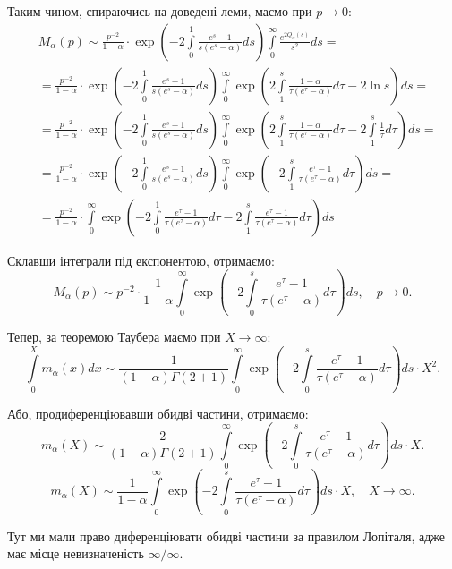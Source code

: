 Таким чином, спираючись на доведені леми, маємо при $p \rightarrow 0$:
\begin{align*}
&M_\alpha(p) \sim \frac{p^{-2}}{1-\alpha} \cdot \exp\left(-2\int\limits_0^1 \frac{e^s  - 1}{s(e^s - \alpha)} ds\right) \int\limits_0^\infty \frac{e^{2Q_\alpha(s)}}{s^2} ds = \\
& = \frac{p^{-2}}{1-\alpha} \cdot \exp\left(-2\int\limits_0^1 \frac{e^s  - 1}{s(e^s - \alpha)} ds\right) \int\limits_0^\infty \exp\left(2\int\limits_1^s \frac{1- \alpha}{\tau(e^\tau - \alpha)} d\tau - 2 \ln s\right) ds = \\
& = \frac{p^{-2}}{1-\alpha} \cdot \exp\left(-2\int\limits_0^1 \frac{e^s  - 1}{s(e^s - \alpha)} ds\right) \int\limits_0^\infty \exp\left(2\int\limits_1^s \frac{1- \alpha}{\tau(e^\tau - \alpha)} d\tau - 2  \int\limits_1^s  \frac{1}{\tau} d\tau \right) ds = \\
& = \frac{p^{-2}}{1-\alpha} \cdot \exp\left(-2\int\limits_0^1 \frac{e^s  - 1}{s(e^s - \alpha)} ds\right) \int\limits_0^\infty \exp\left(-2\int\limits_1^s \frac{e^{\tau} - 1}{\tau(e^\tau - \alpha)} d\tau  \right) ds = \\
& = \frac{p^{-2}}{1-\alpha} \cdot \int\limits_0^\infty \exp\left( -2\int\limits_0^1 \frac{e^{\tau} - 1}{\tau(e^\tau - \alpha)} d\tau -2\int\limits_1^s \frac{e^{\tau} - 1}{\tau(e^\tau - \alpha)} d\tau  \right) ds 
\end{align*}

Склавши інтеграли під експонентою, отримаємо:
\begin{equation}
	M_\alpha(p) \sim p^{-2} \cdot \frac{1}{1-\alpha} \int\limits_0^\infty \exp\left( -2\int\limits_0^s \frac{e^{\tau} - 1}{\tau(e^\tau - \alpha)} d\tau  \right) ds, \quad p \rightarrow 0.
\end{equation}

Тепер, за теоремою Таубера маємо при $X \rightarrow \infty$:
\begin{equation}
	\int\limits_0^X m_\alpha(x) dx \sim \frac{1}{(1-\alpha)\Gamma(2 + 1)} \int\limits_0^\infty \exp\left( -2\int\limits_0^s \frac{e^{\tau} - 1}{\tau(e^\tau - \alpha)} d\tau  \right) ds \cdot X^2.
\end{equation}

Або, продиференціювавши обидві частини,  отримаємо:
\begin{equation}
	m_\alpha(X) \sim \frac{2}{(1- \alpha) \Gamma(2 + 1)} \int\limits_0^\infty \exp\left( -2\int\limits_0^s \frac{e^{\tau} - 1}{\tau(e^\tau - \alpha)} d\tau  \right) ds \cdot X.
\end{equation}
\begin{equation}
	\label{eq:uniform_right_final}
	m_\alpha(X) \sim \frac{1}{1-\alpha} \int\limits_0^\infty \exp\left( -2\int\limits_0^s \frac{e^{\tau} - 1}{\tau(e^\tau - \alpha)} d\tau  \right) ds \cdot X, \quad X \rightarrow \infty.
\end{equation}

Тут ми мали право диференціювати обидві частини за правилом Лопіталя, адже має місце невизначеність $\infty / \infty$.

